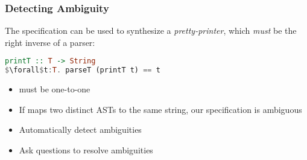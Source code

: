 \begin{frame}[fragile]
\frametitle{Detecting Ambiguity}

The specification can be used to synthesize a {\em pretty-printer},
which {\em must} be the right inverse of a parser:

\begin{lstlisting}[mathescape, language=haskell]
printT :: T -> String
$\forall$t:T. parseT (printT t) == t
\end{lstlisting}

\begin{itemize}
\item{ must be one-to-one}
\item{If  maps two distinct ASTs to the same
    string, our specification is ambiguous}
\item{Automatically detect ambiguities}
\item{Ask questions to resolve ambiguities}
\end{itemize}
\end{frame}

